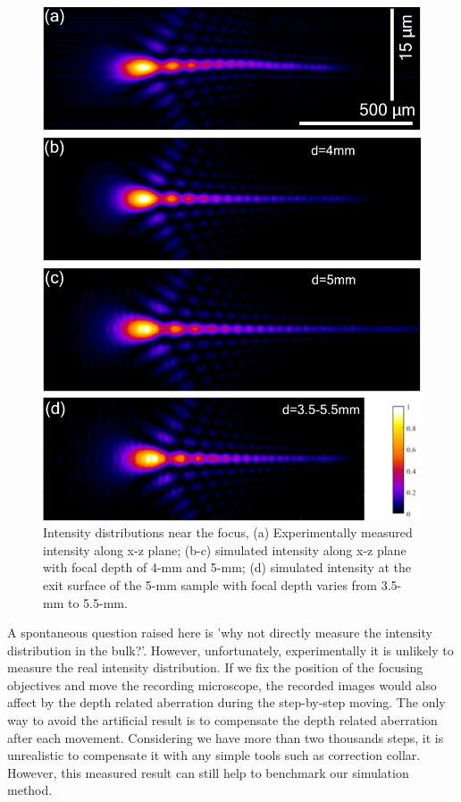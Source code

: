 \documentclass[9pt,twocolumn,twoside]{osajnl}
\begin{document}
\begin{figure}
	\centering
	\includegraphics[width=\linewidth]{../AppOptics/figures/50xSi.pdf}
	\caption{Intensity distributions near the focus, (a) Experimentally measured intensity along x-z plane; (b-c) simulated intensity along x-z plane with focal depth of 4-mm and 5-mm; (d) simulated intensity at the exit surface of the 5-mm sample with focal depth varies from 3.5-mm to 5.5-mm.}\label{fig:5}
\end{figure}

A spontaneous question raised here is 'why not directly measure the intensity distribution in the bulk?'. However, unfortunately, experimentally it is unlikely to measure the real intensity distribution. If we fix the position of the focusing objectives and move the recording microscope, the recorded images would also affect by the depth related aberration during the step-by-step moving. The only way to avoid the artificial result is to compensate the depth related aberration after each movement. Considering we have more than two thousands steps, it is unrealistic to compensate it with any simple tools such as correction collar. However, this measured result can still help to benchmark our simulation method.
\end{document}
